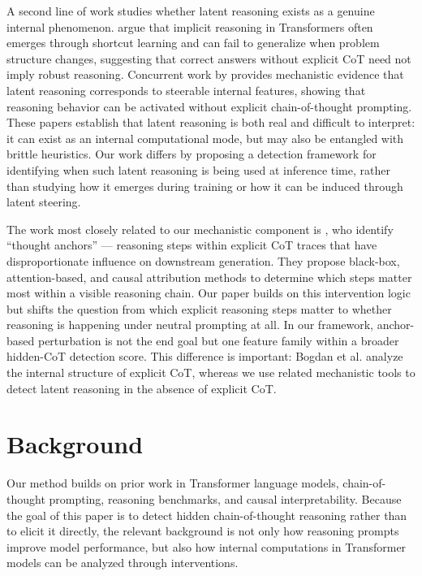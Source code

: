 \documentclass{article}
\theoremstyle{plain}
\theoremstyle{definition}
\theoremstyle{remark}
\begin{document}
A second line of work studies whether latent reasoning exists as a genuine internal phenomenon. \citet{lin_implicit_2025} argue that implicit reasoning in Transformers often emerges through shortcut learning and can fail to generalize when problem structure changes, suggesting that correct answers without explicit CoT need not imply robust reasoning. Concurrent work by \citet{he_reasoning_2026} provides mechanistic evidence that latent reasoning corresponds to steerable internal features, showing that reasoning behavior can be activated without explicit chain-of-thought prompting. These papers establish that latent reasoning is both real and difficult to interpret: it can exist as an internal computational mode, but may also be entangled with brittle heuristics. Our work differs by proposing a detection framework for identifying when such latent reasoning is being used at inference time, rather than studying how it emerges during training or how it can be induced through latent steering.

The work most closely related to our mechanistic component is \citet{bogdan_thought_2025}, who identify ``thought anchors'' --- reasoning steps within explicit CoT traces that have disproportionate influence on downstream generation. They propose black-box, attention-based, and causal attribution methods to determine which steps matter most within a visible reasoning chain. Our paper builds on this intervention logic but shifts the question from which explicit reasoning steps matter to whether reasoning is happening under neutral prompting at all. In our framework, anchor-based perturbation is not the end goal but one feature family within a broader hidden-CoT detection score. This difference is important: Bogdan et al. analyze the internal structure of explicit CoT, whereas we use related mechanistic tools to detect latent reasoning in the absence of explicit CoT.

\section{Background}

Our method builds on prior work in Transformer language models, chain-of-thought prompting, reasoning benchmarks, and causal interpretability. Because the goal of this paper is to detect hidden chain-of-thought reasoning rather than to elicit it directly, the relevant background is not only how reasoning prompts improve model performance, but also how internal computations in Transformer models can be analyzed through interventions.
\end{document}
